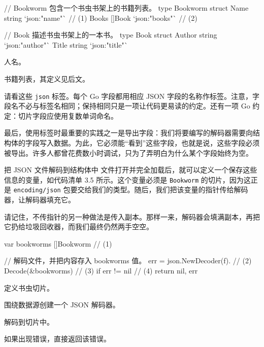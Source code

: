 \begin{gocode}[title={代码清单 3.4 \texttt{bookworm.go}：\texttt{Bookworm} 和 \texttt{Book} 结构体}]
// Bookworm 包含一个书虫书架上的书籍列表。
type Bookworm struct {
    Name  string `json:"name"`  // (1)
    Books []Book `json:"books"` // (2)
}

// Book 描述书虫书架上的一本书。
type Book struct {
    Author string `json:"author"`
    Title  string `json:"title"`
}
\end{gocode}

\begin{codeannotations}
  \item 人名。
  \item 书籍列表，其定义见后文。
\end{codeannotations}

请看这些 \texttt{json} 标签。每个 Go 字段都用相应 JSON 字段的名称作标签。注意，字段名不必与标签名相同；保持相同只是一项让代码更易读的约定。还有一项 Go 约定：切片字段应使用复数单词命名。

最后，使用标签时最重要的实践之一是导出字段：我们将要编写的解码器需要向结构体的字段写入数据。为此，它必须能“看到”这些字段，也就是说，这些字段必须被导出。许多人都曾花费数小时调试，只为了弄明白为什么某个字段始终为空。

\begin{infobox}{把 JSON 文件解码到结构体中}
文件打开并完全加载后，就可以定义一个保存这些信息的变量，如代码清单 3.5 所示。这个变量必须是 \texttt{Bookworm} 的切片，因为这正是 \texttt{encoding/json} 包要交给我们的类型。随后，我们把该变量的指针传给解码器，让解码器填充它。

请记住，不传指针的另一种做法是传入副本。那样一来，解码器会填满副本，再把它扔给垃圾回收器，而我们最终仍然两手空空。
\end{infobox}

\begin{gocode}[title={代码清单 3.5 \texttt{bookworm.go}：在 \texttt{loadBookworms()} 中解码 JSON}]
var bookworms []Bookworm // (1)

// 解码文件，并把内容存入 bookworms 值。
err = json.NewDecoder(f). // (2)
    Decode(&bookworms)    // (3)
if err != nil {           // (4)
    return nil, err
}
\end{gocode}

\begin{codeannotations}
  \item 定义书虫切片。
  \item 围绕数据源创建一个 JSON 解码器。
  \item 解码到切片中。
  \item 如果出现错误，直接返回该错误。
\end{codeannotations}

